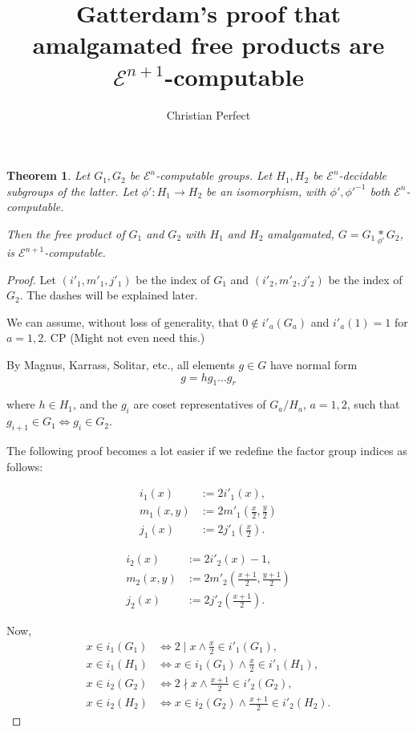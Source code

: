 \documentclass[a4paper]{article}
\newcommand{\grz}[1]{$\mathcal{E}^{#1}$}	%
\theoremstyle{plain}
\newtheorem{theorem}{Theorem}[section]
\theoremstyle{definition}
\newenvironment{cpe}{\noindent\color{OliveGreen} CP }{}
\newcommand{\cp}[1]{
\begin{cpe} #1 \end{cpe}}
\begin{document}
\title{Gatterdam's proof that amalgamated free products are \grz{n+1}-computable}
\author{Christian Perfect}
\maketitle

\begin{theorem}
Let $G_1, G_2$ be \grz{n}-computable groups. Let $H_1, H_2$ be \grz{n}-decidable subgroups of the latter. Let $\phi': H_1 \to H_2$ be an isomorphism, with $\phi', \phi'^{-1}$ both \grz{n}-computable.

Then the free product of $G_1$ and $G_2$ with $H_1$ and $H_2$ amalgamated, $G = G_1 \underset{\phi'}{\ast} G_2$, is \grz{n+1}-computable.
\end{theorem}

\begin{proof}
Let $(i'_1,m'_1,j'_1)$ be the index of $G_1$ and $(i'_2,m'_2,j'_2)$ be the index of $G_2$. The dashes will be explained later.

We can assume, without loss of generality, that $0 \notin i'_a(G_a)$ and $i'_a(1) = 1$ for $a=1,2$. \cp{(Might not even need this.)}

By Magnus, Karrass, Solitar, etc., all elements $g \in G$ have normal form
\[ g = h g_1 \dots g_r \]

where $h \in H_1$, and the $g_i$ are coset representatives of $G_a / H_a$, $a=1,2$, such that $g_{i+1} \in G_1 \Leftrightarrow g_i \in G_2$.

The following proof becomes a lot easier if we redefine the factor group indices as follows:

\begin{align*}
	i_1(x) &:= 2i'_1(x), \\
	m_1(x,y) &:= 2m'_1 \left( \frac{x}{2},\frac{y}{2} \right) \\
	j_1(x) &:= 2j'_1 \left( \frac{x}{2} \right). 
\end{align*}

\begin{align*}
	i_2(x) &:= 2i'_2(x) - 1, \\
	m_2(x,y) &:= 2m'_2 \left( \frac{x+1}{2},\frac{y+1}{2} \right) \\
	j_2(x) &:= 2j'_2 \left( \frac{x+1}{2} \right).
\end{align*}

Now,
\begin{align*}
	x \in i_1(G_1) &\Leftrightarrow 2 \mid x \wedge \frac{x}{2} \in i'_1(G_1), \\
	x \in i_1(H_1) &\Leftrightarrow x \in i_1(G_1) \wedge \frac{x}{2} \in i'_1(H_1), \\
	x \in i_2(G_2) &\Leftrightarrow 2\nmid x  \wedge \frac{x+1}{2} \in i'_2(G_2), \\
	x \in i_2(H_2) &\Leftrightarrow x \in i_2(G_2) \wedge \frac{x+1}{2} \in i'_2(H_2). 
\end{align*}


\end{proof}
\end{document}
